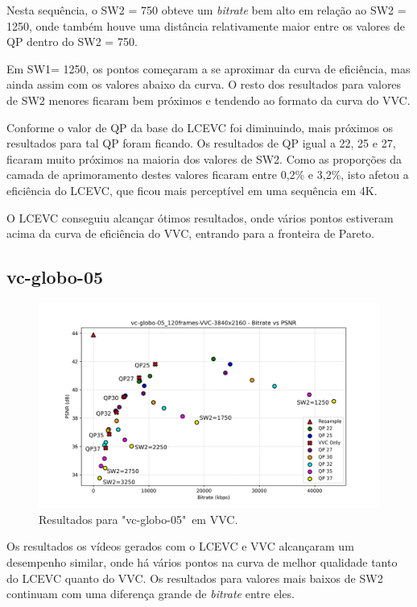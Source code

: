 Nesta sequência, o SW2 = 750 obteve um \textit{bitrate} bem alto em relação ao
SW2 = 1250, onde também houve uma distância relativamente maior entre os valores de
QP dentro do SW2 = 750.

Em SW1= 1250, os pontos começaram a se aproximar da curva de eficiência, mas ainda 
assim com os valores abaixo da curva. O resto dos resultados para valores de SW2 menores
ficaram bem próximos e tendendo ao formato da curva do \acrshort{VVC}.

Conforme o valor de QP da base do \acrshort{LCEVC} foi diminuindo, mais próximos os 
resultados para tal QP foram ficando. Os resultados de QP igual a 22, 25 e 27, ficaram
muito próximos na maioria dos valores de SW2. Como as proporções da camada de aprimoramento
destes valores ficaram entre 0,2\% e 3,2\%, isto afetou a eficiência do \acrshort{LCEVC}, que
ficou mais perceptível em uma sequência em 4K.

O \acrshort{LCEVC} conseguiu alcançar ótimos resultados, onde vários pontos estiveram
acima da curva de eficiência do \acrshort{VVC}, entrando para a fronteira de Pareto.

\newpage

\subsection{vc-globo-05}

\begin{figure}[h]
    \centering
    \includegraphics[width=1.0\textwidth]{img/vc-globo-05_120frames-VVC.png}
    \caption{Resultados para "vc-globo-05"\ em \acrshort{VVC}.}
    \label{fig:vc-globo-05-VVC}
\end{figure}

Os resultados os vídeos gerados com o \acrshort{LCEVC} e \acrshort{VVC} alcançaram
um desempenho similar, onde há vários pontos na curva de melhor qualidade tanto 
do \acrshort{LCEVC} quanto do \acrshort{VVC}. Os resultados para valores mais baixos
de SW2 continuam com uma diferença grande de \textit{bitrate} entre eles.

